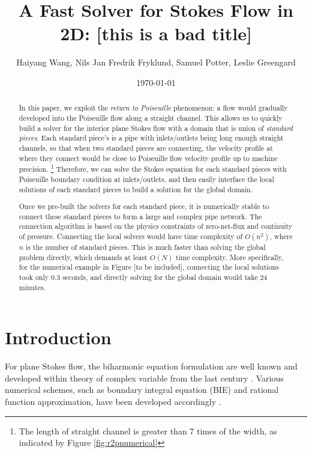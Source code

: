 \documentclass[10pt,twocolumn]{article}
\author{Haiyang Wang, Nils Jan Fredrik Fryklund, Samuel Potter, Leslie Greengard}
\date{\today}
\title{A Fast Solver for Stokes Flow in 2D: [this is a bad title]}
\begin{document}
\maketitle

\begin{abstract}
  In this paper, we exploit the \textit{return to Poiseuille} phenomenon: 
  a flow would gradually developed into the Poiseuille flow along a straight channel. 
  This allows us to quickly build a solver for the interior plane Stokes flow
  with a domain that is union of \textit{standard pieces}. 
  Each standard piece's is a pipe with inlets/outlets 
  being long enough straight channels, so that when two standard pieces are connecting, 
  the velocity profile at where they connect would be close to Poiseuille flow velocity profile up to machine precision. 
  \footnote{The length of straight channel is greater than 7 times of the width, as indicated by Figure \ref{fig:r2pnumerical} }
  Therefore, we can solve the Stokes equation for each standard pieces with Poiseuille boundary condition at inlets/outlets, and then easily interface the local solutions of each standard pieces to build a solution for the global domain.  
  
  Once we pre-built the solvers for each standard piece, 
  it is numerically stable to connect these standard pieces to form 
  a large and complex pipe network. 
  The connection algorithm is based on 
  the physics constraints of  zero-net-flux and continuity of pressure. 
  Connecting the local solvers would have time complexity of $O(n^2)$, 
  where $n$ is the number of standard pieces. 
  This is much faster than solving the global problem directly, which demands at least $O(N)$ time complexity. 
  More specifically, for the numerical example in Figure [to be included], connecting the local solutions took only 0.3 seconds, and directly solving for the global domain would take 24 minutes. 
  
\end{abstract}

\section{Introduction}


For plane Stokes flow, the biharmonic equation formulation are well known 
and developed within theory of complex variable from the last century \cite{ladyzhenskayaMathematicalTheoryViscous1964}. 
Various numerical schemes, such as boundary integral equation (BIE) and rational function approximation, 
have been developed accordingly \cite{greengardIntegralEquationMethods1996,trefethenApproximationTheoryApproximation2019}. 
\end{document}
